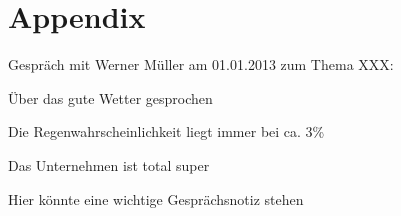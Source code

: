 \section*{Appendix}

\anhangsverzeichnis



Gespräch mit Werner Müller am 01.01.2013 zum Thema XXX:
\begin{compactitem}
   \item Über das gute Wetter gesprochen
   \item Die Regenwahrscheinlichkeit liegt immer bei ca. 3\%
   \item Das Unternehmen ist total super
   \item Hier könnte eine wichtige Gesprächsnotiz stehen
\end{compactitem}
